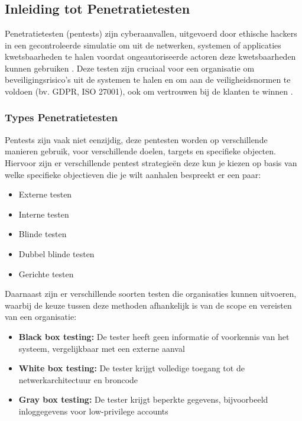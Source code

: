 
\chapter{}
\label{ch:Literatuurstudie}

\section{Inleiding tot Penetratietesten}
Penetratietesten (pentests) zijn cyberaanvallen, uitgevoerd door ethische hackers in een gecontroleerde simulatie om uit de netwerken, systemen of applicaties kwetsbaarheden te halen voordat ongeautoriseerde actoren deze kwetsbaarheden kunnen gebruiken \textcite{Shebli2018}. 
Deze testen zijn cruciaal voor een organisatie om beveiligingsrisico's uit de systemen te halen en om aan de veiligheidsnormen te voldoen (bv. GDPR, ISO 27001), ook om vertrouwen bij de klanten te winnen \parencite{Dalalana2017}.

\subsection{Types Penetratietesten}
Pentests zijn vaak niet eenzijdig, deze pentesten worden op verschillende manieren gebruik, voor verschillende doelen, targets en specifieke objecten.
Hiervoor zijn er verschillende pentest strategieën deze kun je kiezen op basis van welke specifieke objectieven die je wilt aanhalen \textcite{Vats2020} bespreekt er een paar:\sloppy

\begin{itemize}
    \item Externe testen
    \item Interne testen
    \item Blinde testen
    \item Dubbel blinde testen
    \item Gerichte testen
\end{itemize}

Daarnaast zijn er verschillende soorten testen die organisaties kunnen uitvoeren, waarbij de keuze tussen deze methoden afhankelijk is van de scope en vereisten van een organisatie:

\begin{itemize}
    \item \textbf{Black box testing:} De tester heeft geen informatie of voorkennis van het systeem, vergelijkbaar met een externe aanval
    \item \textbf{White box testing:} De tester krijgt volledige toegang tot de netwerkarchitectuur en broncode
    \item \textbf{Gray box testing:} De tester krijgt beperkte gegevens, bijvoorbeeld inloggegevens voor low-privilege accounts
\end{itemize}
\autocite{Khamdamovich2021}

